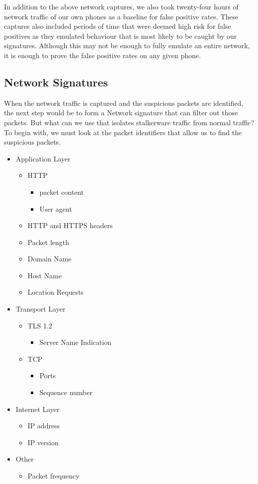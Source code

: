 \documentclass[acmtog]{acmart}
\begin{document}
In addition to the above network captures, we also took twenty-four hours of 
network traffic of our own phones as a baseline for false positive rates. These 
captures also included periods of time that were deemed high risk for false 
positives as they emulated behaviour that is most likely to be caught by our 
signatures. Although this may not be enough to fully emulate an entire network, 
it is enough to prove the false positive rates on any given phone.

\subsection{Network Signatures}
\label{network_signatures}

When the network traffic is captured and the suspicious packets are identified, the next step would be to form a Network signature that can filter out those packets. But what can we use that isolates stalkerware traffic from normal traffic? To begin with, we must look at the packet identifiers that allow us to find the suspicious packets. 
\begin{itemize}
	\item Application Layer
	\begin{itemize}
		\item HTTP
		\begin{itemize}
			\item packet content
			\item User agent
		\end{itemize}
		\item HTTP and HTTPS headers
		\item Packet length
		\item Domain Name
		\item Host Name
		\item Location Requests
	\end{itemize}
	\item Transport Layer
	\begin{itemize}
		\item TLS 1.2
		\begin{itemize}
			\item Server Name Indication
		\end{itemize}
		\item TCP
		\begin{itemize}
			\item Ports
			\item Sequence number
		\end{itemize}
	\end{itemize}
	\item Internet Layer
	\begin{itemize}
		\item IP address
		\item IP version
	\end{itemize}
	\item Other
	\begin{itemize}
		\item Packet frequency
	\end{itemize}
\end{itemize}
\end{document}
